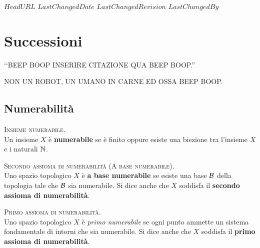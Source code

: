 \svnidlong
{$HeadURL$}
{$LastChangedDate$}
{$LastChangedRevision$}
{$LastChangedBy$}

\chapter{Successioni}

\begin{introduction}
‘‘BEEP BOOP INSERIRE CITAZIONE QUA BEEP BOOP.''
\begin{flushright}
	\textsc{NON UN ROBOT,} UN UMANO IN CARNE ED OSSA BEEP BOOP.
\end{flushright}
\end{introduction}
\section{Numerabilità}
\begin{define}\textsc{Insieme numerabile.}\\
Un insieme $X$ è \textbf{numerabile} se è finito oppure esiste una biezione tra l'insieme $X$ e i naturali $\mathbb{N}$.
\end{define}
\begin{define}\textsc{Secondo assioma di numerabilità (A base numerabile).}\\
Uno spazio topologico $X$ è \textbf{a base numerabile} se esiste una base $\mathcal{B}$ della topologia tale che $\mathcal{B}$ sia numerabile. %
Si dice anche che $X$ soddisfa il \textbf{secondo assioma di numerabilità}.
\end{define}
\begin{define}\textsc{Primo assioma di numerabilità.}\\
Uno spazio topologico $X$ è \textit{primo numerabile} se ogni punto ammette un sistema fondamentale di intorni che sia numerabile. Si dice anche che $X$ soddisfa il \textbf{primo assioma di numerabilità}.
\end{define}
